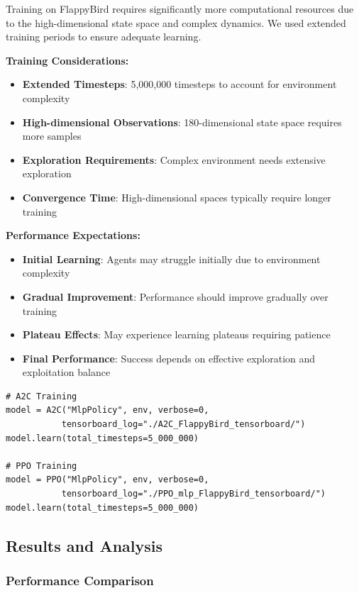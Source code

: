 \documentclass[12pt]{article}
\begin{document}
{{{Training on FlappyBird requires significantly more computational resources due to the high-dimensional state space and complex dynamics. We used extended training periods to ensure adequate learning.

\textbf{Training Considerations:}
\begin{itemize}
    \item \textbf{Extended Timesteps}: 5,000,000 timesteps to account for environment complexity
    \item \textbf{High-dimensional Observations}: 180-dimensional state space requires more samples
    \item \textbf{Exploration Requirements}: Complex environment needs extensive exploration
    \item \textbf{Convergence Time}: High-dimensional spaces typically require longer training
\end{itemize}

\textbf{Performance Expectations:}
\begin{itemize}
    \item \textbf{Initial Learning}: Agents may struggle initially due to environment complexity
    \item \textbf{Gradual Improvement}: Performance should improve gradually over training
    \item \textbf{Plateau Effects}: May experience learning plateaus requiring patience
    \item \textbf{Final Performance}: Success depends on effective exploration and exploitation balance
\end{itemize}

\begin{verbatim}
# A2C Training
model = A2C("MlpPolicy", env, verbose=0, 
           tensorboard_log="./A2C_FlappyBird_tensorboard/")
model.learn(total_timesteps=5_000_000)

# PPO Training
model = PPO("MlpPolicy", env, verbose=0, 
           tensorboard_log="./PPO_mlp_FlappyBird_tensorboard/")
model.learn(total_timesteps=5_000_000)
\end{verbatim}

\subsection{Results and Analysis}

\subsubsection{Performance Comparison}

}}}
\end{document}
